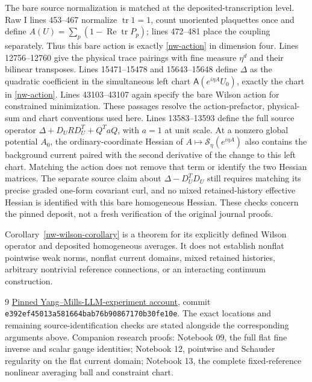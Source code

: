 \documentclass[11pt]{article}
\theoremstyle{remark}
\begin{document}
The bare source normalization is matched at the deposited-transcription level.
Raw I lines 453--467 normalize $\operatorname{tr}1=1$, count
unoriented plaquettes once and define
$A(U)=\sum_p(1-\operatorname{Re}\operatorname{tr}P_p)$;
lines 472--481 place the coupling separately. Thus this bare action
is exactly \eqref{nw-action} in dimension four.
Lines 12756--12760 give the physical trace pairings with fine measure
$\eta^d$ and their bilinear transposes. Lines 15471--15478 and
15643--15648 define $\Delta$ as the quadratic coefficient in the
simultaneous left chart $\mathsf A(e^{i\eta A}U_0)$, exactly the chart
in \eqref{nw-action}. Lines 43103--43107 again specify the bare
Wilson action for constrained minimization. These passages resolve
the action-prefactor, physical-sum and chart conventions used here.
Lines 13583--13593 define the full source operator
$\Delta+D_URD_U^T+Q^TaQ$, with $a=1$ at unit scale.
At a nonzero global potential $A_0$, the ordinary-coordinate Hessian
of $A\mapsto\mathcal S_\eta(e^{i\eta A})$ also contains the background
current paired with the second derivative of the change to this left
chart. Matching the action does not remove that term or identify the
two Hessian matrices. The separate source claim about
$\Delta-D_U^TD_U$ still requires matching its precise graded
one-form covariant curl, and no mixed retained-history effective
Hessian is identified with this bare homogeneous Hessian.
These checks concern the pinned deposit, not a fresh verification
of the original journal proofs.

Corollary~\ref{nw-wilson-corollary} is a theorem for its explicitly
defined Wilson operator and deposited homogeneous averages.
It does not establish nonflat pointwise weak norms, nonflat current
domains, mixed retained histories, arbitrary nontrivial reference
connections, or an interacting continuum construction.

\begin{thebibliography}{9}
\href{https://github.com/ethanwsussman/Yang--Mills-LLM-experiment/tree/e392ef45013a581664bab76b90867170b30fe10e}
{Pinned Yang--Mills-LLM-experiment account}, commit
\texttt{e392ef45013a581664bab76b90867170b30fe10e}.
The exact locations and remaining source-identification checks are stated
alongside the corresponding arguments above.
Companion research proofs: Notebook 09, the full flat fine inverse
and scalar gauge identities; Notebook 12, pointwise and Schauder
regularity on the flat current domain; Notebook 13, the complete
fixed-reference nonlinear averaging ball and constraint chart.
\end{thebibliography}
\end{document}
